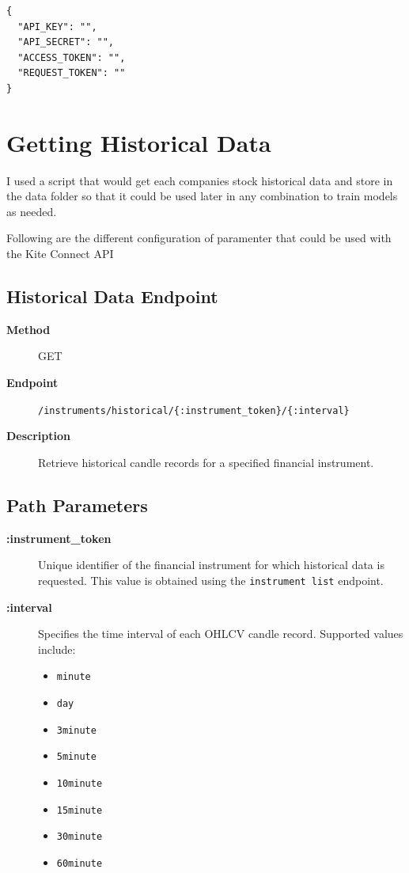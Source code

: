 \begin{lstlisting}[language={}, basicstyle=\ttfamily\small, caption=API Credentials Configuration]
{
  "API_KEY": "",
  "API_SECRET": "",
  "ACCESS_TOKEN": "",
  "REQUEST_TOKEN": ""
}
\end{lstlisting}

\clearpage
\FloatBarrier
\section{Getting Historical Data}

I used a script that would get each companies stock historical data and store in the data folder so that it could be used later in any combination to train models as needed.

Following are the different configuration of paramenter that could be used with the Kite Connect API

\subsection{Historical Data Endpoint}

\begin{description}
    \item[\textbf{Method}] GET
    \item[\textbf{Endpoint}] \texttt{/instruments/historical/\{:instrument\_token\}/\{:interval\}}
    \item[\textbf{Description}] Retrieve historical candle records for a specified financial instrument.
\end{description}


\subsection{Path Parameters}

\begin{description}
    \item[\textbf{:instrument\_token}]  
    Unique identifier of the financial instrument for which historical data is requested.  
    This value is obtained using the \texttt{instrument list} endpoint.

    \item[\textbf{:interval}]  
    Specifies the time interval of each OHLCV candle record.  
    Supported values include:
    \begin{itemize}
        \item \texttt{minute}
        \item \texttt{day}
        \item \texttt{3minute}
        \item \texttt{5minute}
        \item \texttt{10minute}
        \item \texttt{15minute}
        \item \texttt{30minute}
        \item \texttt{60minute}
    \end{itemize}
\end{description}


